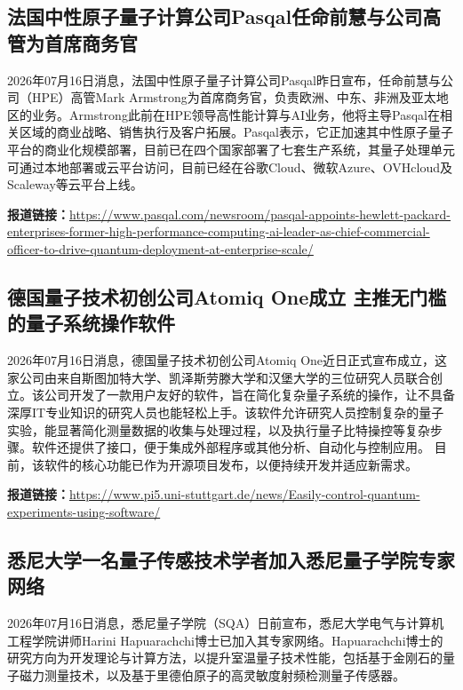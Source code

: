 \documentclass[12pt,a4paper]{ctexart}
\begin{document}
\subsection{ 法国中性原子量子计算公司Pasqal任命前慧与公司高管为首席商务官 }

2026年07月16日消息，法国中性原子量子计算公司Pasqal昨日宣布，任命前慧与公司（HPE）高管Mark Armstrong为首席商务官，负责欧洲、中东、非洲及亚太地区的业务。Armstrong此前在HPE领导高性能计算与AI业务，他将主导Pasqal在相关区域的商业战略、销售执行及客户拓展。Pasqal表示，它正加速其中性原子量子平台的商业化规模部署，目前已在四个国家部署了七套生产系统，其量子处理单元可通过本地部署或云平台访问，目前已经在谷歌Cloud、微软Azure、OVHcloud及Scaleway等云平台上线。

\noindent\textbf{报道链接：}\url{https://www.pasqal.com/newsroom/pasqal-appoints-hewlett-packard-enterprises-former-high-performance-computing-ai-leader-as-chief-commercial-officer-to-drive-quantum-deployment-at-enterprise-scale/}

\subsection{ 德国量子技术初创公司Atomiq One成立 主推无门槛的量子系统操作软件 }

2026年07月16日消息，德国量子技术初创公司Atomiq One近日正式宣布成立，这家公司由来自斯图加特大学、凯泽斯劳滕大学和汉堡大学的三位研究人员联合创立。该公司开发了一款用户友好的软件，旨在简化复杂量子系统的操作，让不具备深厚IT专业知识的研究人员也能轻松上手。该软件允许研究人员控制复杂的量子实验，能显著简化测量数据的收集与处理过程，以及执行量子比特操控等复杂步骤。软件还提供了接口，便于集成外部程序或其他分析、自动化与控制应用。 目前，该软件的核心功能已作为开源项目发布，以便持续开发并适应新需求。

\noindent\textbf{报道链接：}\url{https://www.pi5.uni-stuttgart.de/news/Easily-control-quantum-experiments-using-software/}

\subsection{ 悉尼大学一名量子传感技术学者加入悉尼量子学院专家网络 }

2026年07月16日消息，悉尼量子学院（SQA）日前宣布，悉尼大学电气与计算机工程学院讲师Harini Hapuarachchi博士已加入其专家网络。Hapuarachchi博士的研究方向为开发理论与计算方法，以提升室温量子技术性能，包括基于金刚石的量子磁力测量技术，以及基于里德伯原子的高灵敏度射频检测量子传感器。
\end{document}
